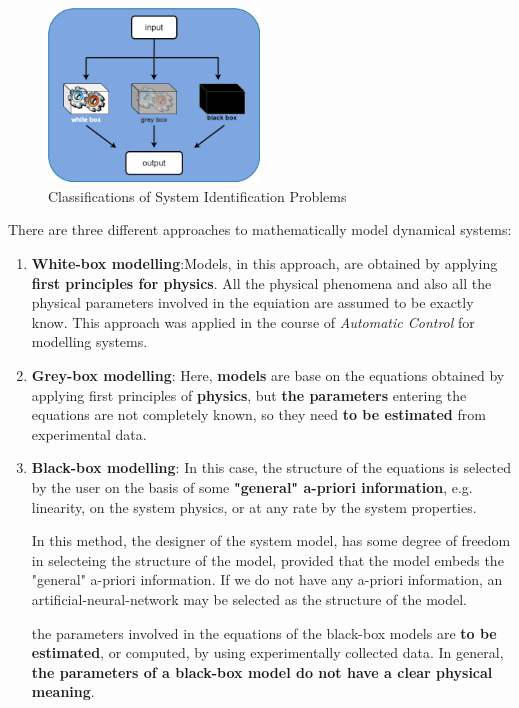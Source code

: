 \begin{figure}[htbp]
    \centering
    \includegraphics[width=0.5\textwidth]{images/system-id-scheme.png}
    \caption{Classifications of System Identification Problems}
    \label{fig:id_classes}
\end{figure}

There are three different approaches to mathematically model dynamical systems:
\begin{enumerate}

\item \textbf{White-box modelling}:\newline Models, in this approach, are obtained by applying \textbf{first principles for physics}. All the physical phenomena and also all the physical parameters involved in the equiation are assumed to be exactly know. This approach was applied in the course of \textit{Automatic Control} for modelling systems.

\item \textbf{Grey-box modelling}: Here, \textbf{models} are base on the equations obtained by applying first principles of \textbf{physics}, but \textbf{the parameters} entering the equations are not completely known, so they need \textbf{to be estimated} from experimental data. 

\item \textbf{Black-box modelling}: In this case, the structure of the equations is selected by the user on the basis of some \textbf{"general" a-priori information}, e.g. linearity, on the system physics, or at any rate by the system properties. \newline 

\begin{factbox}
    In this method, the designer of the system model, has some degree of freedom in selecteing the structure of the model, provided that the model embeds the "general" a-priori information.\newline \newline
    If we do not have any a-priori information, an artificial-neural-network may be selected as the structure of the model.
\end{factbox}
the parameters involved in the equations of the black-box models are \textbf{to be estimated}, or computed, by using experimentally collected data. In general, \textbf{the parameters of a black-box model do not have a clear physical meaning}.
\end{enumerate}


